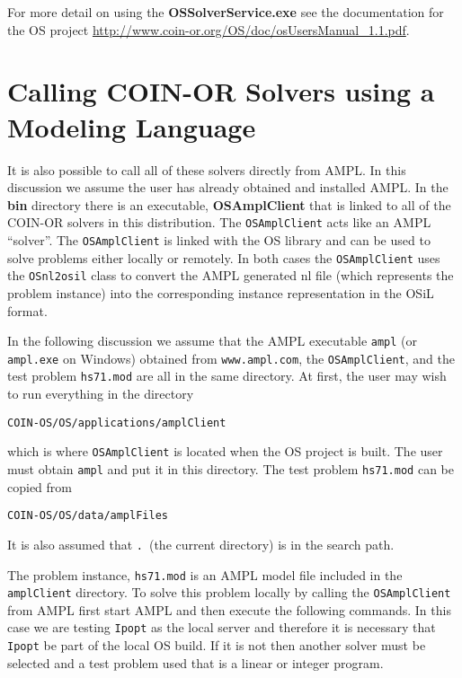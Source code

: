\documentclass[11pt]{article}
\renewcommand{\_}{{\char"5F}}
\renewcommand{\{}{{\char"7B}}
\renewcommand{\}}{{\char"7D}}
\renewcommand{\^}{{\char"0D}}
\renewcommand{\'}{{\char"0D}}
\begin{document}
For more detail on using the {\bf OSSolverService.exe} see the documentation for the OS project \url{http://www.coin-or.org/OS/doc/osUsersManual_1.1.pdf}.

\section{Calling COIN-OR  Solvers using a Modeling Language}\label{section:modellanguage}

It is also possible to call all of these solvers directly from AMPL. In this discussion we assume the user has already obtained and installed AMPL.  In the {\bf bin} directory there is an executable, {\bf OSAmplClient} that is linked to all of the COIN-OR solvers in this distribution.   The {\tt OSAmplClient} acts like an AMPL ``solver''. The {\tt OSAmplClient} is linked with the
OS library and can be used to solve problems either locally or remotely. In both cases the {\tt OSAmplClient} uses the
{\tt OSnl2osil} class to convert the AMPL generated nl file
(which represents the problem instance) into the corresponding instance representation in the OSiL format.

In the following discussion we assume that the AMPL executable {\tt ampl}  (or {\tt ampl.exe} on Windows) obtained
from {\tt www.ampl.com}, the {\tt OSAmplClient}, and the test problem {\tt hs71.mod} are all in the same directory.
At first, the user may wish to run everything in the directory

\begin{verbatim}
COIN-OS/OS/applications/amplClient
\end{verbatim}
which is where {\tt OSAmplClient} is located when the OS project is built. The user must obtain {\tt ampl} and put
it in this directory.  The test problem {\tt hs71.mod} can be copied from

\begin{verbatim}
COIN-OS/OS/data/amplFiles
\end{verbatim}
It is also assumed that {\tt .}~(the current directory) is in the search path.

The  problem instance, {\tt hs71.mod} is an AMPL model file included in the {\tt amplClient} directory.
To solve this problem locally by calling the {\tt OSAmplClient} from AMPL first start AMPL and then
execute the following commands. In this case we are testing  {\tt Ipopt} as the
local server and therefore it is necessary that {\tt Ipopt} be part of the local OS build. If it is not
then another solver must be selected and a test problem used that is a linear or integer program.
\end{document}
